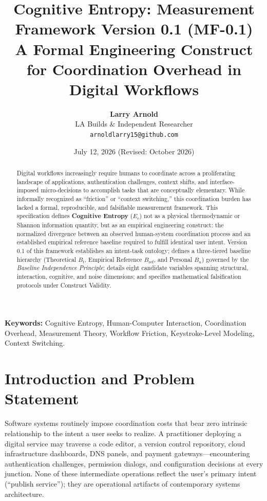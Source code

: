 \documentclass[11pt,a4paper]{article}
\title{\textbf{Cognitive Entropy: Measurement Framework Version 0.1 (MF-0.1)\\A Formal Engineering Construct for Coordination Overhead in Digital Workflows}}
\author{
    \textbf{Larry Arnold}\\
    LA Builds \& Independent Researcher\\
    \texttt{arnoldlarry15@github.com}
}
\date{July 12, 2026 (Revised: October 2026)}
\begin{document}
\maketitle

\begin{abstract}
Digital workflows increasingly require humans to coordinate across a proliferating landscape of applications, authentication challenges, context shifts, and interface-imposed micro-decisions to accomplish tasks that are conceptually elementary. While informally recognized as ``friction'' or ``context switching,'' this coordination burden has lacked a formal, reproducible, and falsifiable measurement framework. This specification defines \textbf{Cognitive Entropy} ($E_c$) not as a physical thermodynamic or Shannon information quantity, but as an empirical engineering construct: the normalized divergence between an observed human-system coordination process and an established empirical reference baseline required to fulfill identical user intent. Version 0.1 of this framework establishes an intent-task ontology; defines a three-tiered baseline hierarchy (Theoretical $B_t$, Empirical Reference $B_{\text{ref}}$, and Personal $B_u$) governed by the \textit{Baseline Independence Principle}; details eight candidate variables spanning structural, interaction, cognitive, and noise dimensions; and specifies mathematical falsification protocols under Construct Validity.
\end{abstract}

\vspace{1em}
\noindent \textbf{Keywords:} Cognitive Entropy, Human-Computer Interaction, Coordination Overhead, Measurement Theory, Workflow Friction, Keystroke-Level Modeling, Context Switching.

\section{Introduction and Problem Statement}
Software systems routinely impose coordination costs that bear zero intrinsic relationship to the intent a user seeks to realize. A practitioner deploying a digital service may traverse a code editor, a version control repository, cloud infrastructure dashboards, DNS panels, and payment gateways---encountering authentication challenges, permission dialogs, and configuration decisions at every junction. None of these intermediate operations reflect the user's primary intent (``publish service''); they are operational artifacts of contemporary systems architecture.
\end{document}
